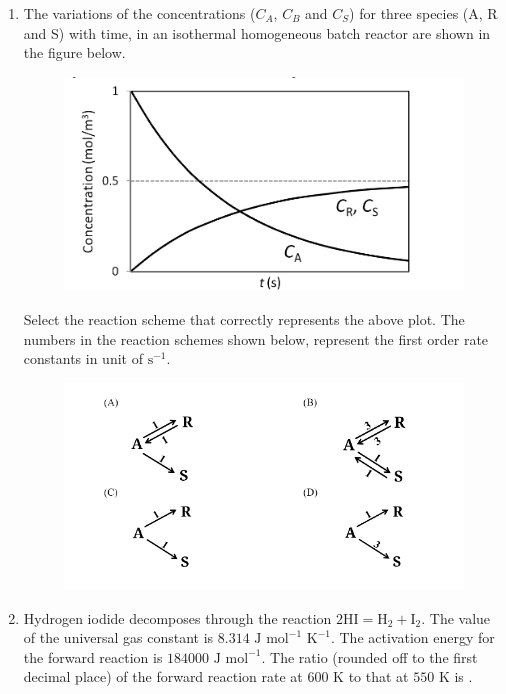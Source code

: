 \documentclass[journal,12pt,onecolumn]{IEEEtran}
\theoremstyle{remark}
\begin{document}
\begin{enumerate}
\item The variations of the concentrations ($C_A$, $C_B$ and $C_S$) for three species (A, R and S) with time, in an isothermal homogeneous batch reactor are shown in the figure below.
\begin{figure}[H]
    \centering
    \includegraphics[width=0.5\columnwidth]{figs/qn 15.jpg}
    \caption{}
    \label{fig:qn 15.jpg}
\end{figure}
Select the reaction scheme that correctly represents the above plot. The numbers in the reaction schemes shown below, represent the first order rate constants in unit of $\text{s}^{-1}$.
\hfill{}
\begin{figure}[H]
    \centering
    \includegraphics[width=0.5\columnwidth]{figs/qn 15 opt.jpg}
    \caption{}
    \label{fig:qn.15 opt.jpg}
\end{figure}
\item Hydrogen iodide decomposes through the reaction $2\text{HI} = \text{H}_2 + \text{I}_2$. The value of the universal gas constant is $8.314 \text{ J mol}^{-1} \text{ K}^{-1}$. The activation energy for the forward reaction is $184000 \text{ J mol}^{-1}$. The ratio (rounded off to the first decimal place) of the forward reaction rate at $600 \text{ K}$ to that at $550 \text{ K}$ is \underline{\hspace{1cm}}.
\hfill{}


\end{enumerate}
\end{document}

